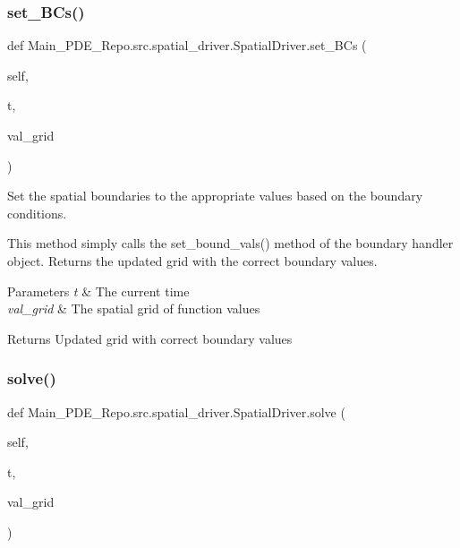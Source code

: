 \subsubsection{\texorpdfstring{set\+\_\+\+B\+Cs()}{set\_BCs()}}
{\footnotesize\ttfamily def Main\+\_\+\+P\+D\+E\+\_\+\+Repo.\+src.\+spatial\+\_\+driver.\+Spatial\+Driver.\+set\+\_\+\+B\+Cs (\begin{DoxyParamCaption}\item[{}]{self,  }\item[{}]{t,  }\item[{}]{val\+\_\+grid }\end{DoxyParamCaption})}



Set the spatial boundaries to the appropriate values based on the boundary conditions. 

This method simply calls the set\+\_\+bound\+\_\+vals() method of the boundary handler object. Returns the updated grid with the correct boundary values. 
\begin{DoxyParams}{Parameters}
{\em t} & The current time \\
\hline
{\em val\+\_\+grid} & The spatial grid of function values \\
\hline
\end{DoxyParams}
\begin{DoxyReturn}{Returns}
Updated grid with correct boundary values 
\end{DoxyReturn}
\mbox{\label{classMain__PDE__Repo_1_1src_1_1spatial__driver_1_1SpatialDriver_ada0ed39211b437d2f86b9b103a690eb3}} 
\subsubsection{\texorpdfstring{solve()}{solve()}}
{\footnotesize\ttfamily def Main\+\_\+\+P\+D\+E\+\_\+\+Repo.\+src.\+spatial\+\_\+driver.\+Spatial\+Driver.\+solve (\begin{DoxyParamCaption}\item[{}]{self,  }\item[{}]{t,  }\item[{}]{val\+\_\+grid }\end{DoxyParamCaption})}



